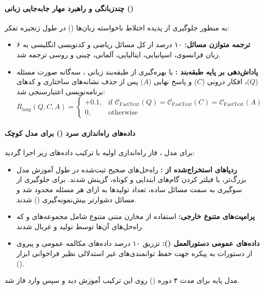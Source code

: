 \paragraph*{چندزبانگی و راهبرد مهار جابه‌جایی زبانی ()}
به منظور جلوگیری از پدیده اختلاط ناخواسته زبان‌ها () در طول زنجیره تفکر:
\begin{itemize}
    \item \textbf{ترجمه متوازن مسائل:} ۱۰ درصد از کل مسائل ریاضی و کدنویسی انگلیسی به ۶ زبان فرانسوی، اسپانیایی، ایتالیایی، آلمانی، چینی و روسی ترجمه شد.
    \item \textbf{پاداش‌دهی بر پایه طبقه‌بند :} با بهره‌گیری از طبقه‌بند زبانی \cite{joulin2016fasttext}، سه‌گانه صورت مسئله ($Q$)، افکار درونی ($C$) و پاسخ نهایی ($A$) پس از حذف نشانه‌های ساختاری و کدهای برنامه‌نویسی اعتبارسنجی شد:
    \begin{equation}
        R_{\text{lang}}(Q, C, A) = \begin{cases} 
            +0.1, & \text{if } \mathcal{C}_{\text{FastText}}(Q) = \mathcal{C}_{\text{FastText}}(C) = \mathcal{C}_{\text{FastText}}(A) \\ 
            0, & \text{otherwise} 
        \end{cases}
    \end{equation}
\end{itemize}

\paragraph*{داده‌های راه‌اندازی سرد () برای مدل کوچک}
برای مدل ، فاز راه‌اندازی اولیه با ترکیب داده‌های زیر اجرا گردید:
\begin{itemize}
    \item \textbf{ردپاهای استخراج‌شده از :} راه‌حل‌های صحیح ثبت‌شده در طول آموزش  مدل بزرگ‌تر، با فیلتر کردن گام‌های ابتدایی و کوتاه، گزینش شدند. برای جلوگیری از سوگیری به سمت مسائل ساده، تعداد تولیدها به ازای هر مسئله محدود شد و مسائل دشوارتر بیش‌نمونه‌گیری () شدند.
    \item \textbf{پرامپت‌های متنوع خارجی:} استفاده از مخازن متنی متنوع شامل مجموعه‌های  \cite{guha2025openthoughts} و  \cite{openr12025, penedo2025codeforces} که راه‌حل‌های آن‌ها توسط  تولید و غربال شدند.
    \item \textbf{داده‌های عمومی دستورالعمل ():} تزریق ۱۰ درصد داده‌های مکالمه عمومی و پیروی از دستورات به پیکره  جهت حفظ توانمندی‌های غیر استدلالی نظیر فراخوانی ابزار ().
\end{itemize}
مدل پایه  برای مدت ۴ دوره () روی این ترکیب آموزش دید و سپس وارد فاز  شد.

